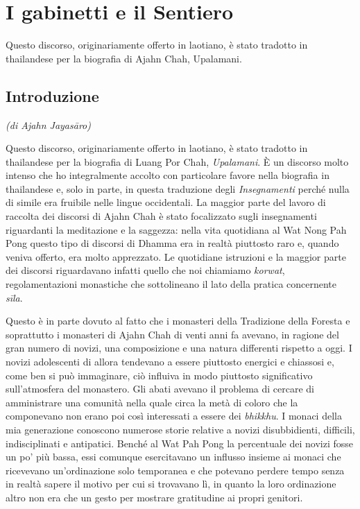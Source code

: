 \chapter{I gabinetti e il Sentiero}

\begin{openingQuote}
  \centering

  Questo discorso, originariamente offerto in laotiano, è stato tradotto in
  thailandese per la biografia di Ajahn Chah, Upalamani.
\end{openingQuote}

\section{Introduzione}

\emph{(di Ajahn Jayasāro)}

Questo discorso,
originariamente offerto in laotiano, è stato tradotto in thailandese per
la biografia di Luang Por Chah, \emph{Upalamani}. È un discorso molto
intenso che ho integralmente accolto con particolare favore nella
biografia in thailandese e, solo in parte, in questa traduzione degli
\emph{Insegnamenti} perché nulla di simile era fruibile nelle lingue
occidentali. La maggior parte del lavoro di raccolta dei discorsi di
Ajahn Chah è stato focalizzato sugli insegnamenti riguardanti la
meditazione e la saggezza: nella vita quotidiana al Wat Nong Pah Pong
questo tipo di discorsi di Dhamma era in realtà piuttosto raro e, quando
veniva offerto, era molto apprezzato. Le quotidiane istruzioni e la
maggior parte dei discorsi riguardavano infatti quello che noi chiamiamo
\emph{korwat}, regolamentazioni monastiche che sottolineano il lato
della pratica concernente \emph{sīla}.

Questo è in parte dovuto al fatto che i monasteri della Tradizione della
Foresta e soprattutto i monasteri di Ajahn Chah di venti anni fa
avevano, in ragione del gran numero di novizi, una composizione e una
natura differenti rispetto a oggi. I novizi adolescenti di allora
tendevano a essere piuttosto energici e chiassosi e, come ben si può
immaginare, ciò influiva in modo piuttosto significativo sull'atmosfera
del monastero. Gli abati avevano il problema di cercare di amministrare
una comunità nella quale circa la metà di coloro che la componevano non
erano poi così interessati a essere dei \emph{bhikkhu}. I monaci della
mia generazione conoscono numerose storie relative a novizi
disubbidienti, difficili, indisciplinati e antipatici. Benché al Wat Pah
Pong la percentuale dei novizi fosse un po' più bassa, essi comunque
esercitavano un influsso insieme ai monaci che ricevevano un'ordinazione
solo temporanea e che potevano perdere tempo senza in realtà sapere il
motivo per cui si trovavano lì, in quanto la loro ordinazione altro non
era che un gesto per mostrare gratitudine ai propri genitori.

